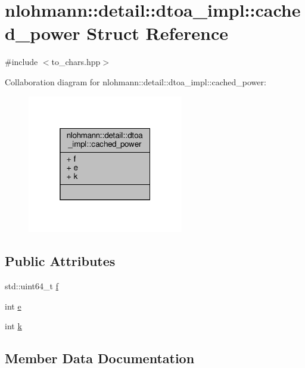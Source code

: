 \hypertarget{structnlohmann_1_1detail_1_1dtoa__impl_1_1cached__power}{}\section{nlohmann\+:\+:detail\+:\+:dtoa\+\_\+impl\+:\+:cached\+\_\+power Struct Reference}
\label{structnlohmann_1_1detail_1_1dtoa__impl_1_1cached__power}


{\ttfamily \#include $<$to\+\_\+chars.\+hpp$>$}



Collaboration diagram for nlohmann\+:\+:detail\+:\+:dtoa\+\_\+impl\+:\+:cached\+\_\+power\+:
\nopagebreak
\begin{figure}[H]
\begin{center}
\leavevmode
\includegraphics[width=193pt]{structnlohmann_1_1detail_1_1dtoa__impl_1_1cached__power__coll__graph}
\end{center}
\end{figure}
\subsection*{Public Attributes}
\begin{DoxyCompactItemize}
\item 
std\+::uint64\+\_\+t \hyperlink{structnlohmann_1_1detail_1_1dtoa__impl_1_1cached__power_a21ae81f515f5b08d5bf423775ee56074}{f}
\item 
int \hyperlink{structnlohmann_1_1detail_1_1dtoa__impl_1_1cached__power_a9e89bc89bb7bf4361f43ea27eed91d23}{e}
\item 
int \hyperlink{structnlohmann_1_1detail_1_1dtoa__impl_1_1cached__power_a8c1f2efed643eeaa8fae83c697a29c6a}{k}
\end{DoxyCompactItemize}


\subsection{Member Data Documentation}
\mbox{\label{structnlohmann_1_1detail_1_1dtoa__impl_1_1cached__power_a9e89bc89bb7bf4361f43ea27eed91d23}} 
